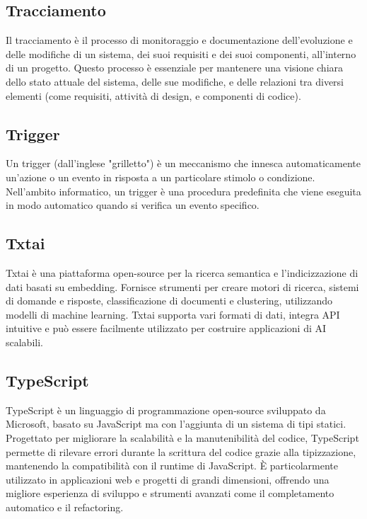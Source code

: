 \subsection*{Tracciamento}
Il tracciamento è il processo di monitoraggio e documentazione dell'evoluzione e delle modifiche di un sistema, dei suoi requisiti e dei suoi componenti, 
all’interno di un progetto. Questo processo è essenziale per mantenere una visione chiara dello stato attuale del sistema, delle sue modifiche, e delle 
relazioni tra diversi elementi (come requisiti, attività di design, e componenti di codice).

\hypertarget{sec:trigger}{}
\subsection*{Trigger}
Un trigger (dall'inglese "grilletto") è un meccanismo che innesca automaticamente un'azione o un evento in risposta a un particolare 
stimolo o condizione. Nell'ambito informatico, un trigger è una procedura predefinita che viene eseguita in modo automatico quando 
si verifica un evento specifico.

\hypertarget{sec:txtai}{}
\subsection*{Txtai}
Txtai è una piattaforma open-source per la ricerca semantica e l'indicizzazione di dati basati su embedding. Fornisce strumenti per creare motori di 
ricerca, sistemi di domande e risposte, classificazione di documenti e clustering, utilizzando modelli di machine learning. Txtai supporta vari formati 
di dati, integra API intuitive e può essere facilmente utilizzato per costruire applicazioni di AI scalabili.

\hypertarget{sec:typescript}{}
\subsection*{TypeScript}
TypeScript è un linguaggio di programmazione open-source sviluppato da Microsoft, basato su JavaScript ma con l'aggiunta di un sistema di tipi statici. 
Progettato per migliorare la scalabilità e la manutenibilità del codice, TypeScript permette di rilevare errori durante la scrittura del codice grazie 
alla tipizzazione, mantenendo la compatibilità con il runtime di JavaScript. È particolarmente utilizzato in applicazioni web e progetti di grandi 
dimensioni, offrendo una migliore esperienza di sviluppo e strumenti avanzati come il completamento automatico e il refactoring.

